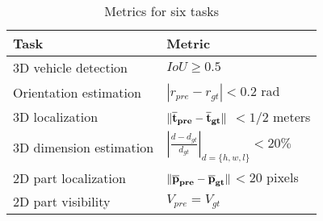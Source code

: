 \renewcommand{\arraystretch}{1.5}
\begin{table}[ht]
	\centering
	\caption{Metrics for six tasks}
	\label{my-label}
	\begin{tabular}{|m{6cm}|m{6cm}|}
		\hline
		Task                    & Metric         \\ \hline
		3D vehicle detection    & $IoU \geq 0.5$ \\  \hline
		Orientation estimation  & $|r_{pre} - r_{gt}|  < 0.2$ rad     \\ \hline
		3D localization         &$\bf \lVert \overline t_{pre} - \overline t_{gt} \rVert$ $< 1 / 2$ meters   \\ \hline
		3D dimension estimation & $\left | \frac{d-d_{gt}}{d_{gt}} \right | _{d =\{h,w,l\}}<  20\%$           \\ \hline
		2D part localization    & $ \bf \lVert \overline p_{pre} - \overline p_{gt} \rVert $$<  20$ pixels      \\ \hline
		2D part visibility      &     $V_{pre} = V_{gt}$         \\ \hline
	\end{tabular}
\end{table}
